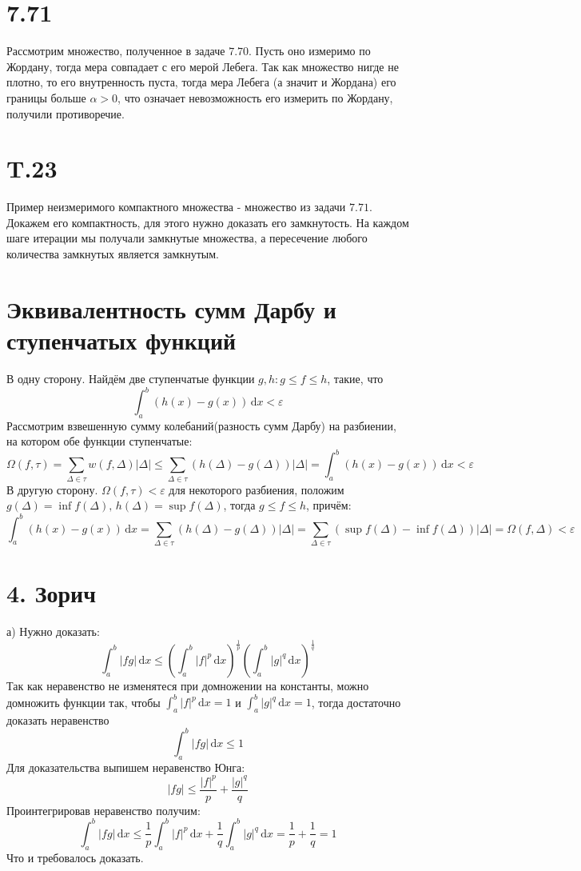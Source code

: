\documentclass[12pt]{article}
\begin{document}
\section{7.71}
Рассмотрим множество, полученное в задаче $7.70$. Пусть оно измеримо по Жордану, тогда мера совпадает с его мерой Лебега. 
Так как множество нигде не плотно, то его внутренность пуста, тогда мера Лебега (а значит и Жордана) его границы больше $\alpha > 0$, что означает невозможность 
его измерить по Жордану, получили противоречие. 
\section{T.23}
Пример неизмеримого компактного множества - множество из задачи $7.71$. Докажем его компактность, для этого 
нужно доказать его замкнутость. На каждом шаге итерации мы получали замкнутые множества, а пересечение любого количества 
замкнутых является замкнутым.
\section{Эквивалентность сумм Дарбу и ступенчатых функций}
В одну сторону. Найдём две ступенчатые функции $g, h: g \leq f \leq h$, такие, что 
\[
    \int_{a}^{b} (h(x) - g(x)) \,\mathrm{d}x < \varepsilon 
\]  
Рассмотрим взвешенную сумму колебаний(разность сумм Дарбу) на разбиении, на котором обе функции ступенчатые: 
\[
    \Omega(f, \tau) = \sum_{\Delta \in \tau} w(f, \Delta)\vert \Delta \vert \leq 
    \sum_{\Delta \in \tau} (h(\Delta) - g(\Delta))\vert \Delta \vert = \int_{a}^{b} (h(x) - g(x)) \,\mathrm{d}x < \varepsilon 
\]
В другую сторону. $\Omega(f, \tau) < \varepsilon$ для некоторого разбиения, положим 
$g(\Delta) = \inf f(\Delta), \, h(\Delta) = \sup f(\Delta)$, тогда 
$g \leq f \leq h$, причём:
\[
    \int_{a}^{b} (h(x) - g(x)) \,\mathrm{d}x = 
    \sum_{\Delta \in \tau} (h(\Delta) - g(\Delta))\vert \Delta \vert = 
    \sum_{\Delta \in \tau} (\sup f(\Delta) - \inf f(\Delta))\vert \Delta \vert = \Omega(f, \Delta) < \varepsilon
\] 
\section{4. Зорич}
а) Нужно доказать: 
\[
    \int_{a}^{b} \vert fg \vert \,\mathrm{d}x \leq \left( \int_{a}^{b} \vert f \vert^p  \,\mathrm{d}x \right) ^\frac{1}{p} \left( \int_{a}^{b} \vert g \vert^q  \,\mathrm{d}x \right) ^\frac{1}{q}
\]
Так как неравенство не изменятеся при домножении на константы, можно домножить функции так, чтобы 
$\int_{a}^{b} \vert f \vert^p  \,\mathrm{d}x = 1$ и $\int_{a}^{b} \vert g \vert^q \,\mathrm{d}x = 1$, тогда достаточно доказать неравенство
\[
    \int_{a}^{b} \vert fg \vert \,\mathrm{d}x \leq 1
\] 
Для доказательства выпишем неравенство Юнга: 
\[
    \vert fg \vert \leq \frac{\vert f \vert^p}{p} + \frac{\vert g \vert^q}{q} 
\]
Проинтегрировав неравенство получим: 
\[
    \int_{a}^{b} \vert fg \vert \,\mathrm{d}x \leq \frac{1}{p} \int_{a}^{b} \vert f \vert^p \,\mathrm{d}x + \frac{1}{q} \int_{a}^{b} \vert g \vert^q \,\mathrm{d}x = \frac{1}{p} + \frac{1}{q} = 1
\]
Что и требовалось доказать.
\end{document}
